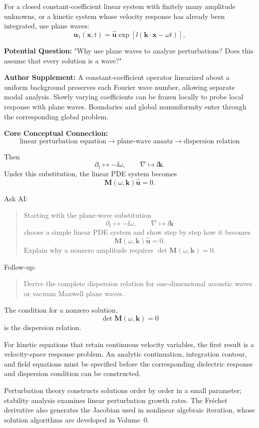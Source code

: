 For a closed constant-coefficient linear system with finitely many amplitude unknowns, or a kinetic system whose velocity response has already been integrated, use plane waves:
\[
\bm u_1(\bm x,t)
=
\widehat{\bm u}
\exp[\ii(\bm k\cdot\bm x-\omega t)],
\]

\begin{authornote}
\textbf{Potential Question:}
"Why use plane waves to analyze perturbations? Does this assume that every solution is a wave?"

\textbf{Author Supplement:}
A constant-coefficient operator linearized about a uniform background preserves each Fourier wave number, allowing separate modal analysis. Slowly varying coefficients can be frozen locally to probe local response with plane waves. Boundaries and global nonuniformity enter through the corresponding global problem.

\textbf{Core Conceptual Connection:}
\[
\text{linear perturbation equation}
\longrightarrow
\text{plane-wave ansatz}
\longrightarrow
\text{dispersion relation}
\]
\end{authornote}

Then
\[
\partial_t\mapsto-\ii\omega,
\qquad
\nabla\mapsto\ii\bm k.
\]
Under this substitution, the linear PDE system becomes
\[
\bm M(\omega,\bm k)\widehat{\bm u}=0.
\]

\begin{askai}
Ask AI:
\begin{quote}
Starting with the plane-wave substitution
\[
\partial_t\mapsto-\ii\omega,\qquad \nabla\mapsto\ii\bm k
\]
choose a simple linear PDE system and show step by step how it becomes
\[
\bm M(\omega,\bm k)\widehat{\bm u}=0.
\]
Explain why a nonzero amplitude requires \(\det\bm M(\omega,\bm k)=0\).
\end{quote}

Follow-up:
\begin{quote}
Derive the complete dispersion relation for one-dimensional acoustic waves or vacuum Maxwell plane waves.
\end{quote}
\end{askai}

The condition for a nonzero solution,
\[
\det\bm M(\omega,\bm k)=0
\]
is the dispersion relation.

For kinetic equations that retain continuous velocity variables, the first result is a velocity-space response problem. An analytic continuation, integration contour, and field equations must be specified before the corresponding dielectric response and dispersion condition can be constructed.

Perturbation theory constructs solutions order by order in a small parameter; stability analysis examines linear perturbation growth rates. The Fr\'echet derivative also generates the Jacobian used in nonlinear algebraic iteration, whose solution algorithms are developed in Volume~0.
